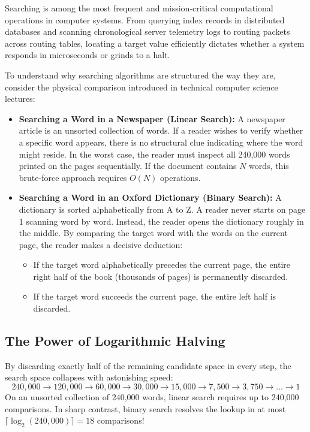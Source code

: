 \documentclass[10pt,journal,compsoc,onecolumn]{IEEEtran}
\begin{document}
Searching is among the most frequent and mission-critical computational operations in computer systems. From querying index records in distributed databases and scanning chronological server telemetry logs to routing packets across routing tables, locating a target value efficiently dictates whether a system responds in microseconds or grinds to a halt.

To understand why searching algorithms are structured the way they are, consider the physical comparison introduced in technical computer science lectures:
\begin{itemize}
    \item \textbf{Searching a Word in a Newspaper (Linear Search):} A newspaper article is an unsorted collection of words. If a reader wishes to verify whether a specific word appears, there is no structural clue indicating where the word might reside. In the worst case, the reader must inspect all 240,000 words printed on the pages sequentially. If the document contains $N$ words, this brute-force approach requires $O(N)$ operations.
    \item \textbf{Searching a Word in an Oxford Dictionary (Binary Search):} A dictionary is sorted alphabetically from A to Z. A reader never starts on page 1 scanning word by word. Instead, the reader opens the dictionary roughly in the middle. By comparing the target word with the words on the current page, the reader makes a decisive deduction:
    \begin{itemize}
        \item If the target word alphabetically precedes the current page, the entire right half of the book (thousands of pages) is permanently discarded.
        \item If the target word succeeds the current page, the entire left half is discarded.
    \end{itemize}
\end{itemize}

\subsection{The Power of Logarithmic Halving}

By discarding exactly half of the remaining candidate space in every step, the search space collapses with astonishing speed:
\[
240{,}000 \longrightarrow 120{,}000 \longrightarrow 60{,}000 \longrightarrow 30{,}000 \longrightarrow 15{,}000 \longrightarrow 7{,}500 \longrightarrow 3{,}750 \longrightarrow \dots \longrightarrow 1
\]
On an unsorted collection of 240,000 words, linear search requires up to 240,000 comparisons. In sharp contrast, binary search resolves the lookup in at most $\lceil \log_2(240{,}000) \rceil = 18$ comparisons! 
\end{document}
